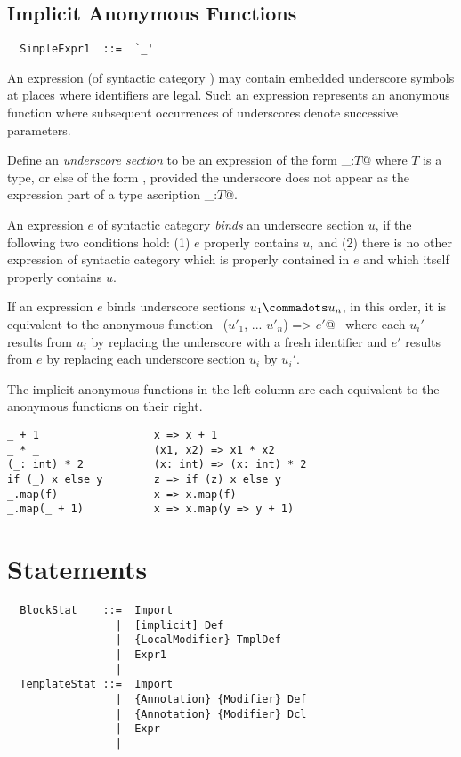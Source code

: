 \subsection*{Implicit Anonymous Functions}\label{sec:impl-anon-fun}

\syntax\begin{lstlisting}
  SimpleExpr1  ::=  `_'
\end{lstlisting}

An expression (of syntactic category \lstinline@Expr@)
may contain embedded underscore symbols \code{_} at places where identifiers
are legal. Such an expression represents an anonymous function where subsequent
occurrences of underscores denote successive parameters.

Define an {\em underscore section} to be an expression of the form
\lstinline@_:$T$@ where $T$ is a type, or else of the form \code{_},
provided the underscore does not appear as the expression part of a
type ascription \lstinline@_:$T$@.

An expression $e$ of syntactic category  {\em binds} an underscore section
$u$, if the following two conditions hold: (1) $e$ properly contains $u$, and
(2) there is no other expression of syntactic category  
which is properly contained in $e$ and which itself properly contains $u$.

If an expression $e$ binds underscore sections $u_1 \commadots u_n$, in this order, it is equivalent to 
the anonymous function ~\lstinline@($u'_1$, ... $u'_n$) => $e'$@~
where each $u_i'$ results from $u_i$ by replacing the underscore with a fresh identifier and
$e'$ results from $e$ by replacing each underscore section $u_i$ by $u_i'$.

\example The implicit anonymous functions in the left column are each equivalent to the 
anonymous functions on their right.

\begin{lstlisting}
_ + 1                  x => x + 1
_ * _                  (x1, x2) => x1 * x2
(_: int) * 2           (x: int) => (x: int) * 2
if (_) x else y        z => if (z) x else y
_.map(f)               x => x.map(f)
_.map(_ + 1)           x => x.map(y => y + 1)
\end{lstlisting}

\section{Statements}
\label{sec:statements}

\syntax\begin{lstlisting}
  BlockStat    ::=  Import
                 |  [implicit] Def
                 |  {LocalModifier} TmplDef
                 |  Expr1
                 | 
  TemplateStat ::=  Import
                 |  {Annotation} {Modifier} Def
                 |  {Annotation} {Modifier} Dcl
                 |  Expr
                 | 
\end{lstlisting}

